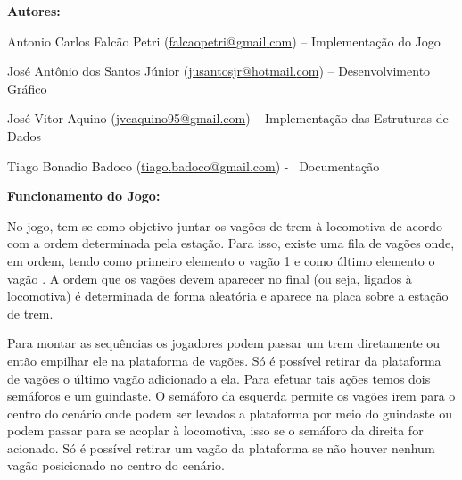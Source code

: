 \documentclass[a4paper]{article}
\begin{document}
{\color{black}
\textbf{Autores:}}

{\color{black}
Antonio Carlos Falcão Petri
(\href{mailto:falcaopetri@gmail.com}{falcaopetri}\href{mailto:falcaopetri@gmail.com}{@}\href{mailto:falcaopetri@gmail.com}{gmail}\href{mailto:falcaopetri@gmail.com}{.}\href{mailto:falcaopetri@gmail.com}{com})
– Implementação do Jogo}

{\color{black}
José Antônio dos Santos Júnior
(\href{mailto:jusantosjr@hotmail.com}{jusantosjr}\href{mailto:jusantosjr@hotmail.com}{@}\href{mailto:jusantosjr@hotmail.com}{hotmail}\href{mailto:jusantosjr@hotmail.com}{.}\href{mailto:jusantosjr@hotmail.com}{com})
– Desenvolvimento Gráfico}

{\color{black}
José Vitor Aquino
(\href{mailto:jvcaquino95@gmail.com}{jvcaquino}\href{mailto:jvcaquino95@gmail.com}{95@}\href{mailto:jvcaquino95@gmail.com}{gmail}\href{mailto:jvcaquino95@gmail.com}{.}\href{mailto:jvcaquino95@gmail.com}{com})
– Implementação das Estruturas de Dados}

{\color{black}
Tiago Bonadio Badoco
(\href{mailto:tiago.badoco@gmail.com}{tiago}\href{mailto:tiago.badoco@gmail.com}{.}\href{mailto:tiago.badoco@gmail.com}{badoco}\href{mailto:tiago.badoco@gmail.com}{@}\href{mailto:tiago.badoco@gmail.com}{gmail}\href{mailto:tiago.badoco@gmail.com}{.}\href{mailto:tiago.badoco@gmail.com}{com})
- \ Documentação}


\bigskip

{\color{black}
\textbf{Funcionamento do Jogo:}}

{\color{black}
No jogo, tem-se como objetivo juntar os vagões de trem à locomotiva de
acordo com a ordem determinada pela estação. Para isso, existe uma fila
de vagões onde, em ordem, tendo como primeiro elemento o vagão 1 e como
último elemento o vagão . A ordem que os vagões devem aparecer no final
(ou seja, ligados à locomotiva) é determinada de forma aleatória e
aparece na placa sobre a estação de trem.}

{\color{black}
Para montar as sequências os jogadores podem passar um trem diretamente
ou então empilhar ele na plataforma de vagões. Só é possível retirar da
plataforma de vagões o último vagão adicionado a ela. Para efetuar tais
ações temos dois semáforos e um guindaste. O semáforo da esquerda
permite os vagões irem para o centro do cenário onde podem ser levados
a plataforma por meio do guindaste ou podem passar para se acoplar à
locomotiva, isso se o semáforo da direita for acionado. Só é possível
retirar um vagão da plataforma se não houver nenhum vagão posicionado
no centro do cenário.}
\end{document}
